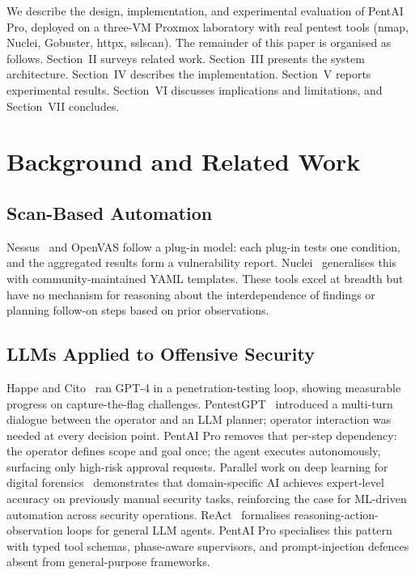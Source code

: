 \documentclass[conference]{IEEEtran}
\begin{document}
We describe the design, implementation, and experimental evaluation of
PentAI Pro, deployed on a three-VM Proxmox laboratory with real pentest
tools (nmap, Nuclei, Gobuster, httpx, sslscan).
The remainder of this paper is organised as follows.
Section~II surveys related work.
Section~III presents the system architecture.
Section~IV describes the implementation.
Section~V reports experimental results.
Section~VI discusses implications and limitations, and
Section~VII concludes.

\section{Background and Related Work}

\subsection{Scan-Based Automation}

Nessus~\cite{nessus} and OpenVAS follow a plug-in model: each plug-in
tests one condition, and the aggregated results form a vulnerability
report. Nuclei~\cite{nuclei} generalises this with community-maintained
YAML templates. These tools excel at breadth but have no mechanism
for reasoning about the interdependence of findings or planning follow-on
steps based on prior observations.

\subsection{LLMs Applied to Offensive Security}

Happe and Cito~\cite{happe2023} ran GPT-4 in a penetration-testing loop,
showing measurable progress on capture-the-flag challenges.
PentestGPT~\cite{deng2023} introduced a multi-turn dialogue between
the operator and an LLM planner; operator interaction was needed at
every decision point.
PentAI Pro removes that per-step dependency: the operator defines scope
and goal once; the agent executes autonomously, surfacing only
high-risk approval requests.
Parallel work on deep learning for digital forensics~\cite{chowdhury2025deepfake}
demonstrates that domain-specific AI achieves expert-level accuracy
on previously manual security tasks, reinforcing the case for
ML-driven automation across security operations.
ReAct~\cite{yao2022} formalises reasoning-action-observation loops for
general LLM agents. PentAI Pro specialises this pattern with
typed tool schemas, phase-aware supervisors, and prompt-injection defences
absent from general-purpose frameworks.
\end{document}
